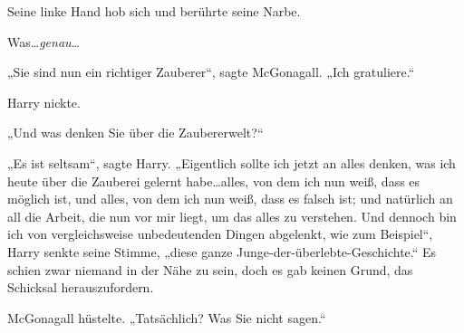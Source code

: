Seine linke Hand hob sich und berührte seine Narbe.

Was…\emph{genau}…

„Sie sind nun ein richtiger Zauberer“, sagte McGonagall. „Ich gratuliere.“

Harry nickte.

„Und was denken Sie über die Zaubererwelt?“

„Es ist seltsam“, sagte Harry. „Eigentlich sollte ich jetzt an alles denken, was ich heute über die Zauberei gelernt habe…alles, von dem ich nun weiß, dass es möglich ist, und alles, von dem ich nun weiß, dass es falsch ist; und natürlich an all die Arbeit, die nun vor mir liegt, um das alles zu verstehen. Und dennoch bin ich von vergleichsweise unbedeutenden Dingen abgelenkt, wie zum Beispiel“, Harry senkte seine Stimme, „diese ganze Junge-der-überlebte-Geschichte.“ Es schien zwar niemand in der Nähe zu sein, doch es gab keinen Grund, das Schicksal herauszufordern.

McGonagall hüstelte. „Tatsächlich? Was Sie nicht sagen.“

